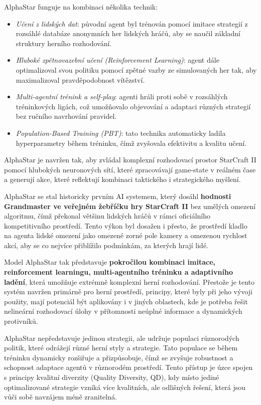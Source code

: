 AlphaStar funguje na kombinaci několika technik:
\begin{itemize}
    \item \textit{Učení z lidských dat}: původní agent byl trénován pomocí imitace strategií z rozsáhlé databáze anonymních her lidských hráčů, aby se naučil základní struktury herního rozhodování.
    \item \textit{Hluboké zpětnovazební učení (Reinforcement Learning)}: agent dále optimalizoval svou politiku pomocí zpětné vazby ze simulovaných her tak, aby maximalizoval pravděpodobnost vítězství.
    \item \textit{Multi-agentní trénink a self-play}: agenti hráli proti sobě v rozsáhlých tréninkových ligách, což umožňovalo objevování a adaptaci různých strategií bez ručního navrhování pravidel.
    \item \textit{Population-Based Training (PBT)}\cite{Jaderberg2017}: tato technika automaticky ladila hyperparametry během tréninku, čímž zvyšovala efektivitu a kvalitu učení.
\end{itemize}

AlphaStar je navržen tak, aby zvládal komplexní rozhodovací prostor StarCraft II pomocí hlubokých neuronových sítí, které zpracovávají game-state v reálném čase a generují akce, které reflektují kombinaci taktického i strategického myšlení.

AlphaStar se stal historicky prvním AI systemem, který dosáhl \textbf{hodnosti Grandmaster ve veřejném žebříčku hry StarCraft II} bez umělých omezení algoritmu, čímž překonal většinu lidských hráčů v rámci oficiálního kompetitivního prostředí. Tento výkon byl dosažen i přesto, že prostředí kladlo na agenta lidské omezení jako omezené zorné pole kamery a omezenou rychlost akcí, aby se co nejvíce přiblížilo podmínkám, za kterých hrají lidé.

Model AlphaStar tak představuje \textbf{pokročilou kombinaci imitace, reinforcement learningu, multi-agentního tréninku a adaptivního ladění}, která umožňuje extrémně komplexní herní rozhodování. Přestože je tento systém navržen primárně pro herní prostředí, principy, které byly při jeho vývoji použity, mají potenciál být aplikovány i v jiných oblastech, kde je potřeba řešit nelineární rozhodovací úlohy v přítomnosti neúplné informace a dynamických protivníků.

AlphaStar nepředstavuje jedinou strategii, ale udržuje populaci různorodých politik, které odrážejí různé herní styly a strategie. Tato populace se během tréninku dynamicky rozšiřuje a přizpůsobuje, čímž se zvyšuje robustnost a schopnost adaptace agentů v různorodém prostředí. Tento přístup je úzce spojen s principy kvalitní diverzity (Quality Diversity, QD), kdy místo jediné optimalizované strategie vzniká více kvalitních, ale odlišných řešení, která jsou vůči sobě navzájem méně zranitelná.

